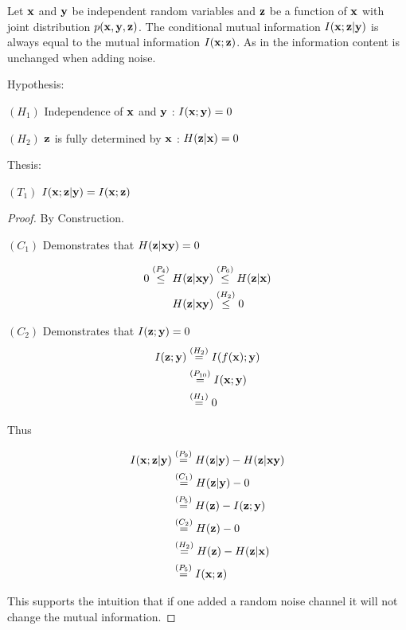 \begin{lemma}
Let ${\mathbf{x}}$ and ${\mathbf{y}}$ be independent random variables and ${\mathbf{z}}$ be a function of ${\mathbf{x}}$ with joint distribution $p({\mathbf{x}}, {\mathbf{y}}, {\mathbf{z}})$. The conditional mutual information $I({\mathbf{x}}; {\mathbf{z}}| {\mathbf{y}})$ is always equal to the mutual information $I({\mathbf{x}}; {\mathbf{z}})$. As in the information content is unchanged when adding noise.

Hypothesis:

$(H_1)$ Independence of ${\mathbf{x}}$ and ${\mathbf{y}}$ : $I({\mathbf{x}};{\mathbf{y}}) = 0$

$(H_2)$  ${\mathbf{z}}$ is fully determined by ${\mathbf{x}}$ : $H({\mathbf{z}}|{\mathbf{x}}) = 0$

Thesis:

$(T_1)$ $I({\mathbf{x}}; {\mathbf{z}}| {\mathbf{y}}) = I({\mathbf{x}}; {\mathbf{z}})$

\begin{proof}
By Construction.

$(C_1)$ Demonstrates that $H({\mathbf{z}}| {\mathbf{x}} {\mathbf{y}}) = 0$

$$
\begin{aligned}
0 \stackrel{\left(P_4\right)}{\leq} H({\mathbf{z}}|{\mathbf{x}} {\mathbf{y}})&\stackrel{\left(P_6\right)}{\leq}H({\mathbf{z}}|{\mathbf{x}})\\
H({\mathbf{z}}|{\mathbf{x}} {\mathbf{y}})&\stackrel{\left(H_2\right)}{\leq} 0
\end{aligned}
$$

$(C_2)$ Demonstrates that $I({\mathbf{z}};{\mathbf{y}}) = 0$
$$
\begin{aligned}
I({\mathbf{z}}; {\mathbf{y}})&\stackrel{\left(H_2\right)}{=}I(f({\mathbf{x}});{\mathbf{y}})\\
&\stackrel{\left(P_{10}\right)}{=}I({\mathbf{x}} ; {\mathbf{y}})\\
&\stackrel{\left(H_{1}\right)}{=}0\\
\end{aligned}
$$

Thus

$$
\begin{aligned}
I({\mathbf{x}}; {\mathbf{z}}| {\mathbf{y}}) &\stackrel{\left(P_9\right)}{=} H({\mathbf{z}}|{\mathbf{y}}) - H({\mathbf{z}}|{\mathbf{x}} {\mathbf{y}})\\
&\stackrel{\left(C_1\right)}{=} H({\mathbf{z}}| {\mathbf{y}})- 0\\
&\stackrel{\left(P_5\right)}{=} H({\mathbf{z}}) - I({\mathbf{z}}; {\mathbf{y}}) \\
&\stackrel{\left(C_2\right)}{=}H({\mathbf{z}}) - 0 \\
&\stackrel{\left(H_2\right)}{=}H({\mathbf{z}}) - H({\mathbf{z}}| {\mathbf{x}}) \\
&\stackrel{\left(P_5\right)}{=}I({\mathbf{x}}; {\mathbf{z}})
\end{aligned}
$$

This supports the intuition that if one added a random noise channel it will not change the mutual information.

\end{proof}
\label{infonoise}
\end{lemma}

